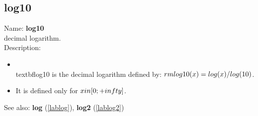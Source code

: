 \subsection{log10}
\label{lablog10}
\noindent Name: \textbf{log10}\\
decimal logarithm.\\
\noindent Description: \begin{itemize}

\item \\textbf{log10} is the decimal logarithm defined by: ${\\rm log10}(x) = \\log(x)/\\log(10)$.\n
\item It is defined only for $x \\in [0; +\\infty]$.\n\end{itemize}
See also: \textbf{log} (\ref{lablog}), \textbf{log2} (\ref{lablog2})
